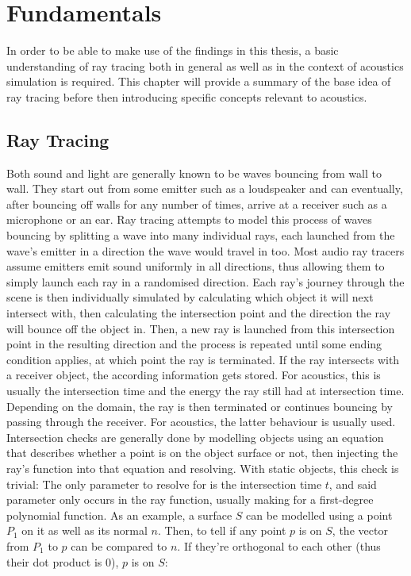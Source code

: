 \chapter{Fundamentals}\label{ch:Fundamentals}

In order to be able to make use of the findings in this thesis,
a basic understanding of ray tracing both in general as well as in the context of acoustics simulation is required.
This chapter will provide a summary of the base idea of ray tracing
before then introducing specific concepts relevant to acoustics.

\section{Ray Tracing}\label{sec:FundamentalRT}

Both sound and light are generally known to be waves bouncing from wall to wall.
They start out from some emitter such as a loudspeaker and can eventually,
after bouncing off walls for any number of times, arrive at a receiver such as a microphone or an ear.
Ray tracing attempts to model this process of waves bouncing by splitting a wave into many individual rays,
each launched from the wave's emitter in a direction the wave would travel in too.
Most audio ray tracers assume emitters emit sound uniformly in all directions,
thus allowing them to simply launch each ray in a randomised direction.
\newline
Each ray's journey through the scene is then individually simulated
by calculating which object it will next intersect with,
then calculating the intersection point and the direction the ray will bounce off the object in.
Then, a new ray is launched from this intersection point in the resulting direction and the process is repeated
until some ending condition applies, at which point the ray is terminated.
If the ray intersects with a receiver object, the according information gets stored.
For acoustics, this is usually the intersection time and the energy the ray still had at intersection time.
Depending on the domain, the ray is then terminated or continues bouncing by passing through the receiver.
For acoustics, the latter behaviour is usually used.
\newline
Intersection checks are generally done by modelling objects using an equation that describes whether a point is on the object surface or not,
then injecting the ray's function into that equation and resolving.
With static objects, this check is trivial:
The only parameter to resolve for is the intersection time \(t\), and said parameter only occurs in the ray function,
usually making for a first-degree polynomial function.
\newline
As an example, a surface \(S\) can be modelled using a point \(P_1\) on it as well as its normal \(n\).
Then, to tell if any point \(p\) is on \(S\), the vector from \(P_1\) to \(p\) can be compared to \(n\).
If they're orthogonal to each other (thus their dot product is 0), \(p\) is on \(S\):

